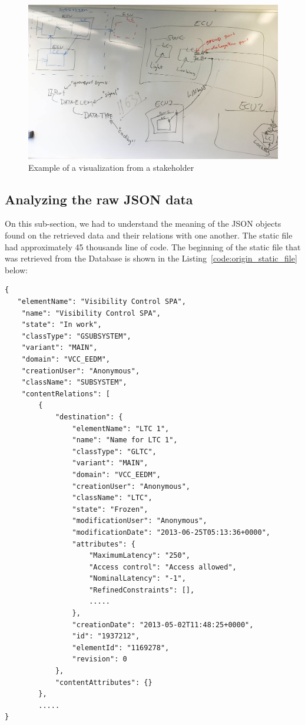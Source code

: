 \begin{figure}[H]
\centering
\captionsetup{justification=centering}
\vspace{0cm}%
\includegraphics[width=0.85\linewidth]{figure/misc/Hakan.jpg}
\caption{Example of a visualization from a stakeholder}
\label{fig:hakan-diagram-board}
\end{figure}

\subsection{Analyzing the raw JSON data}
\label{IM:analyzing_the_raw_json_data}
On this sub-section, we had to understand the meaning of the JSON objects found on the retrieved data and their relations with one another. The static file had approximately 45 thousands line of code. The beginning of the static file that was retrieved from the Database is shown in the Listing~\ref{code:origin_static_file} below:

\begin{lstlisting}[caption= The section found in the beginning of the visualized static file, label=code:origin_static_file]
{
   "elementName": "Visibility Control SPA", 
    "name": "Visibility Control SPA", 
    "state": "In work", 
    "classType": "GSUBSYSTEM", 
    "variant": "MAIN", 
    "domain": "VCC_EEDM", 
    "creationUser": "Anonymous", 
    "className": "SUBSYSTEM", 
    "contentRelations": [
        {
            "destination": {
                "elementName": "LTC 1", 
                "name": "Name for LTC 1", 
                "classType": "GLTC", 
                "variant": "MAIN", 
                "domain": "VCC_EEDM", 
                "creationUser": "Anonymous", 
                "className": "LTC", 
                "state": "Frozen", 
                "modificationUser": "Anonymous", 
                "modificationDate": "2013-06-25T05:13:36+0000", 
                "attributes": {
                    "MaximumLatency": "250", 
                    "Access control": "Access allowed", 
                    "NominalLatency": "-1", 
                    "RefinedConstraints": [], 
                    .....
                }, 
                "creationDate": "2013-05-02T11:48:25+0000", 
                "id": "1937212", 
                "elementId": "1169278", 
                "revision": 0
            }, 
            "contentAttributes": {}
        }, 
        .....   
}
\end{lstlisting}

